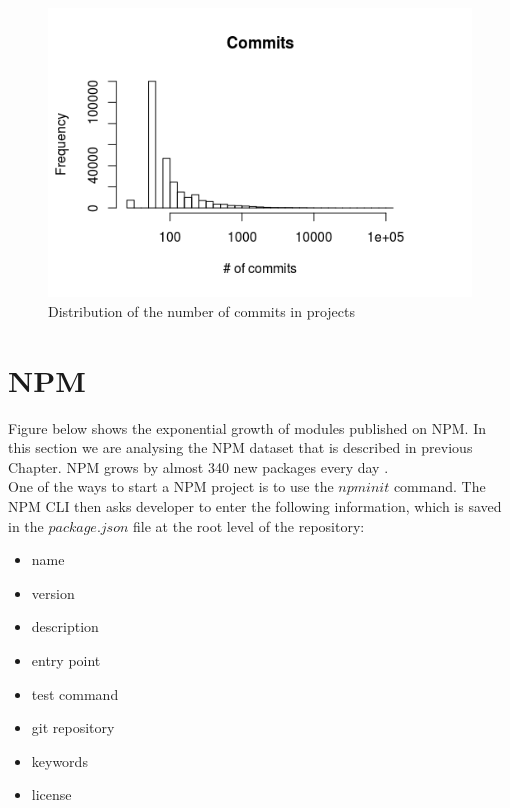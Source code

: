 \documentclass[thesis=M,english]{FITthesis}[2012/10/20]
\begin{document}
\begin{center}
\begin{figure}[h!]
	\includegraphics[totalheight=240pt]{images/meta_commits.png}
	\caption{Distribution of the number of commits in projects}
	\label{fig: meta_subs}
\end{figure}
\end{center}

\newpage

\section{NPM}

Figure below shows the exponential growth of modules published on NPM. In this section we are analysing the NPM dataset that is described in previous Chapter. NPM grows by almost 340 new packages every day \cite{modulecounts}. \\



One of the ways to start a NPM project is to use the $npm init$ command. The NPM CLI then asks developer to enter the following information, which is saved in the $package.json$ file at the root level of the repository:

\begin{multicols}{2}
\begin{itemize}
\item name
\item version
\item description
\item entry point
\item test command
\item git repository
\item keywords
\item license
\end{itemize}
\end{multicols}
\end{document}
